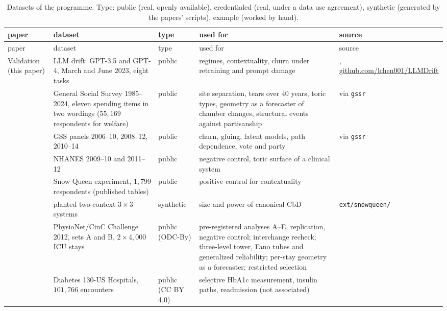 \documentclass[11pt]{article}
\theoremstyle{definition}
\theoremstyle{remark}
\begin{document}
{\footnotesize
\setlength{\tabcolsep}{3pt}
\begin{longtable}{>{\raggedright}p{1.7cm}>{\raggedright}p{3.7cm}>{\raggedright}p{1.5cm}>{\raggedright}p{3.9cm}>{\raggedright\arraybackslash}p{4.2cm}}
\caption{Datasets of the programme. Type: public (real, openly available), credentialed (real, under a data use agreement), synthetic
(generated by the papers' scripts), example (worked by hand).}\label{tab:datasets}\\
\toprule
paper & dataset & type & used for & source\\
\midrule\endfirsthead
\toprule paper & dataset & type & used for & source\\\midrule\endhead
\bottomrule\endfoot
Validation (this paper) & LLM drift: GPT-3.5 and GPT-4, March and June 2023, eight tasks & public & regimes, contextuality, churn under retraining and prompt damage & \cite{ChenZaharia2024}, \url{github.com/lchen001/LLMDrift}\\
 & General Social Survey 1985--2024, eleven spending items in two wordings ($55{,}169$ respondents for welfare) & public & site separation, tears over 40 years, toric types, geometry as a forecaster of chamber changes, structural events against partisanship & \cite{GSS} via \texttt{gssr} \cite{Healy2024}\\
 & GSS panels 2006--10, 2008--12, 2010--14 & public & churn, gluing, latent models, path dependence, vote and party & \cite{GSS} via \texttt{gssr}\\
 & NHANES 2009--10 and 2011--12 & public & negative control, toric surface of a clinical system & \cite{NHANESpkg}\\
 & Snow Queen experiment, $1{,}799$ respondents (published tables) & public & positive control for contextuality & \cite{CervantesDzhafarov2018}\\
 & planted two-context $3\times3$ systems & synthetic & size and power of canonical CbD & \texttt{ext/snowqueen/}\\
 & PhysioNet/CinC Challenge 2012, sets A and B, $2\times4{,}000$ ICU stays & public (ODC-By) & pre-registered analyses A--E, replication, negative control; interchange recheck; three-level tower, Fano tubes and generalized reliability; per-stay geometry as a forecaster; restricted selection & \cite{Silva2012,Goldberger2000}\\
 & Diabetes 130-US Hospitals, $101{,}766$ encounters & public (CC BY 4.0) & selective HbA1c measurement, insulin paths, readmission (not associated) & \cite{Strack2014,UCIDiabetes}\\

\end{longtable}}
\end{document}
